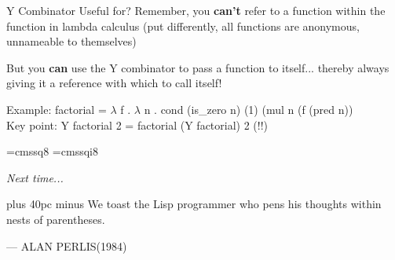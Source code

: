 \documentclass[aspectratio=169]{beamer}
\begin{document}
\begin{frame}{Y Combinator Useful for?}
Remember, you \textbf{can't} refer to a function within the function in lambda calculus (put differently, all functions are anonymous, unnameable to themselves) \\ \pause

But you \textbf{can} use the Y combinator to pass a function to itself... thereby always giving it a reference with which to call itself! \\ \pause

Example: factorial = $\lambda$ f . $\lambda$ n . cond (is\_zero n) (1) (mul n (f (pred n)) \\ \pause
Key point: Y factorial 2 = factorial (Y factorial) 2 (!!)

\end{frame}

\font\eightss=cmssq8
\font\eightssi=cmssqi8
\newcommand\quoteAuthorDate[3]{\begingroup
  \baselineskip 10pt
  \parfillskip 0pt
  \interlinepenalty 10000 %
  \leftskip 0pt plus 40pc minus \parindent
  \let\rm=\eightss
  \let\sl=\eightssi
  \everypar{\sl}#1\par
  \nobreak\smallskip
  \noindent\rm--- #2\unskip\enspace(#3)\par
  \endgroup}
\begin{frame}
    \textit{Next time...}
    \begin{center}
        \item \quoteAuthorDate{We toast the Lisp programmer who pens his thoughts within nests of parentheses.}{ALAN PERLIS}{1984}
    \end{center}
\end{frame}
\end{document}
